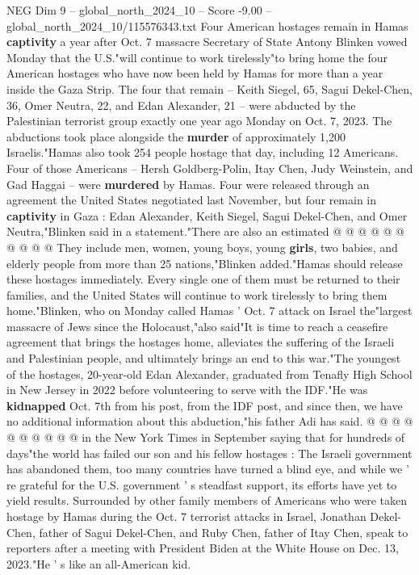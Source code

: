 \begin{textsample}{NEG Dim 9 – global\_north\_2024\_10 – Score -9.00 – global\_north\_2024\_10/115576343.txt}  \label{ex:f9_neg_044}
Four American hostages remain in Hamas \textbf{captivity} a year after Oct. 7 massacre Secretary of State Antony Blinken vowed Monday that the U.S."will continue to work tirelessly"to bring home the four American hostages who have now been held by Hamas for more than a year inside the Gaza Strip.
The four that remain -- Keith Siegel, 65, Sagui Dekel-Chen, 36, Omer Neutra, 22, and Edan Alexander, 21 -- were abducted by the Palestinian terrorist group exactly one year ago Monday on Oct. 7, 2023.
The abductions took place alongside the \textbf{murder} of approximately 1,200 Israelis."Hamas also took 254 people hostage that day, including 12 Americans.
Four of those Americans -- Hersh Goldberg-Polin, Itay Chen, Judy Weinstein, and Gad Haggai -- were \textbf{murdered} by Hamas.
Four were released through an agreement the United States negotiated last November, but four remain in \textbf{captivity} in Gaza : Edan Alexander, Keith Siegel, Sagui Dekel-Chen, and Omer Neutra,"Blinken said in a statement."There are also an estimated @ @ @ @ @ @ @ @ @ @ They include men, women, young boys, young \textbf{girls}, two babies, and elderly people from more than 25 nations,"Blinken added."Hamas should release these hostages immediately.
Every single one of them must be returned to their families, and the United States will continue to work tirelessly to bring them home."Blinken, who on Monday called Hamas ' Oct. 7 attack on Israel the"largest massacre of Jews since the Holocaust,"also said"It is time to reach a ceasefire agreement that brings the hostages home, alleviates the suffering of the Israeli and Palestinian people, and ultimately brings an end to this war."The youngest of the hostages, 20-year-old Edan Alexander, graduated from Tenafly High School in New Jersey in 2022 before volunteering to serve with the IDF."He was \textbf{kidnapped} Oct. 7th from his post, from the IDF post, and since then, we have no additional information about this abduction,"his father Adi has said. @ @ @ @ @ @ @ @ @ @ in the New York Times in September saying that for hundreds of days"the world has failed our son and his fellow hostages : The Israeli government has abandoned them, too many countries have turned a blind eye, and while we ' re grateful for the U.S. government ' s steadfast support, its efforts have yet to yield results.
Surrounded by other family members of Americans who were taken hostage by Hamas during the Oct. 7 terrorist attacks in Israel, Jonathan Dekel-Chen, father of Sagui Dekel-Chen, and Ruby Chen, father of Itay Chen, speak to reporters after a meeting with President Biden at the White House on Dec. 13, 2023."He ' s like an all-American kid.

\end{textsample}
